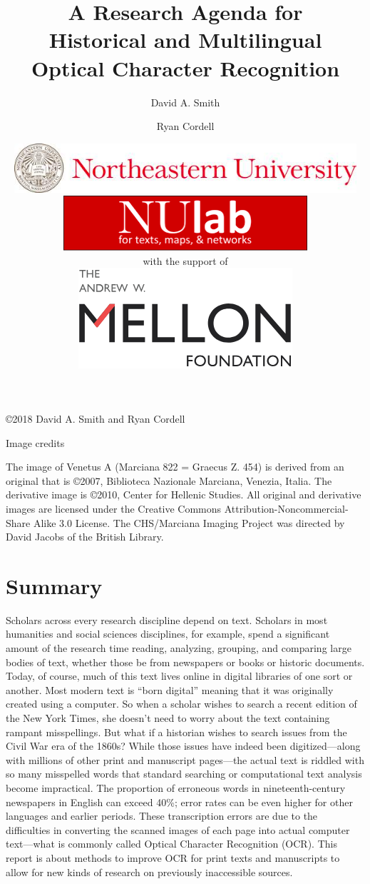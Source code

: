 \documentclass[twoside,11pt]{report}
\title{\Huge A Research Agenda for \\ Historical and Multilingual \\ Optical Character Recognition}
\author{\huge David A. Smith \and \huge Ryan Cordell}
\date{\centering \vspace{0.2in} \includegraphics[width=5in]{northeastern.png} \vspace{0.5in} \\
  \includegraphics{nulab.png} \\
  \vspace{0.2in} \centering \huge with the support of \\ \vspace{0.1in}
  \includegraphics{mellon.png}}
\newcommand\BackgroundPic{%
\put(0,0){%
\parbox[b][\paperheight]{\paperwidth}{%
\vfill
\centering
\texttt{[image: VA013RN-0014-mask.png]}%
\vfill
}}}
\begin{document}
\AddToShipoutPicture*{\BackgroundPic}

\maketitle

\copyright 2018 David A. Smith and Ryan Cordell

Image credits

The image of Venetus A (Marciana 822 = Graecus Z. 454) is derived from an original that is \copyright 2007, Biblioteca Nazionale Marciana, Venezia, Italia. The derivative image is \copyright 2010, Center for Hellenic Studies. All original and derivative images are licensed under the Creative Commons Attribution-Noncommercial-Share Alike 3.0 License. The CHS/Marciana Imaging Project was directed by David Jacobs of the British Library.

\tableofcontents

\chapter{Summary}
\label{sec:summary}

Scholars across every research discipline depend on text. Scholars in most humanities and social sciences disciplines, for example, spend a significant amount of the research time reading, analyzing, grouping, and comparing large bodies of text, whether those be from newspapers or books or historic documents. Today, of course, much of this text lives online in digital libraries of one sort or another. Most modern text is ``born digital'' meaning that it was originally created using a computer. So when a scholar wishes to search a recent edition of the New York Times, she doesn't need to worry about the text containing rampant misspellings. But what if a historian wishes to search issues from the Civil War era of the 1860s? While those issues have indeed been digitized---along with millions of other print and manuscript pages---the actual text is riddled with so many misspelled words that standard searching or computational text analysis become impractical. The proportion of erroneous words in nineteenth-century newspapers in English can exceed 40\%; error rates can be even higher for other languages and earlier periods. These transcription errors are due to the difficulties in converting the scanned images of each page into actual computer text---what is commonly called Optical Character Recognition (OCR). This report is about methods to improve OCR for print texts and manuscripts to allow for new kinds of research on previously inaccessible sources.
\end{document}
